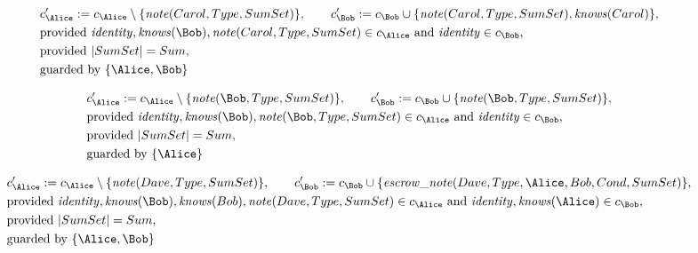 \begin{align*}
&
c'_
{
\Alice
}
 := 
c_
{
\Alice
}
 \setminus 
\{
\mathit{\detokenize{
note
}}
(
Carol
,
Type
,
SumSet
)
\}
, \qquad 
c'_
{
\Bob
}
 := 
c_
{
\Bob
}
 \cup 
\{
\mathit{\detokenize{
note
}}
(
Carol
,
Type
,
SumSet
)
,
\mathit{\detokenize{
knows
}}
(
Carol
)
\}
,\\
&
\text{provided } 
\mathit{\detokenize{
identity
}}
,
\mathit{\detokenize{
knows
}}
(
\Bob
)
,
\mathit{\detokenize{
note
}}
(
Carol
,
Type
,
SumSet
)
 \in c_
{
\Alice
}
 \text{ and } 
\mathit{\detokenize{
identity
}}
 \in c_
{
\Bob
}
,\\
&
\text{provided } 
|
SumSet
|
=
Sum
,\\
&
\text{guarded by } \{
\Alice
,
\Bob
\}
\end{align*}

\begin{align*}
&
c'_
{
\Alice
}
 := 
c_
{
\Alice
}
 \setminus 
\{
\mathit{\detokenize{
note
}}
(
\Bob
,
Type
,
SumSet
)
\}
, \qquad 
c'_
{
\Bob
}
 := 
c_
{
\Bob
}
 \cup 
\{
\mathit{\detokenize{
note
}}
(
\Bob
,
Type
,
SumSet
)
\}
,\\
&
\text{provided } 
\mathit{\detokenize{
identity
}}
,
\mathit{\detokenize{
knows
}}
(
\Bob
)
,
\mathit{\detokenize{
note
}}
(
\Bob
,
Type
,
SumSet
)
 \in c_
{
\Alice
}
 \text{ and } 
\mathit{\detokenize{
identity
}}
 \in c_
{
\Bob
}
,\\
&
\text{provided } 
|
SumSet
|
=
Sum
,\\
&
\text{guarded by } \{
\Alice
\}
\end{align*}

\begin{align*}
&
c'_
{
\Alice
}
 := 
c_
{
\Alice
}
 \setminus 
\{
\mathit{\detokenize{
note
}}
(
Dave
,
Type
,
SumSet
)
\}
, \qquad 
c'_
{
\Bob
}
 := 
c_
{
\Bob
}
 \cup 
\{
\mathit{\detokenize{
escrow_note
}}
(
Dave
,
Type
,
\Alice
,
Bob
,
Cond
,
SumSet
)
\}
,\\
&
\text{provided } 
\mathit{\detokenize{
identity
}}
,
\mathit{\detokenize{
knows
}}
(
\Bob
)
,
\mathit{\detokenize{
knows
}}
(
Bob
)
,
\mathit{\detokenize{
note
}}
(
Dave
,
Type
,
SumSet
)
 \in c_
{
\Alice
}
 \text{ and } 
\mathit{\detokenize{
identity
}}
,
\mathit{\detokenize{
knows
}}
(
\Alice
)
 \in c_
{
\Bob
}
,\\
&
\text{provided } 
|
SumSet
|
=
Sum
,\\
&
\text{guarded by } \{
\Alice
,
\Bob
\}
\end{align*}

